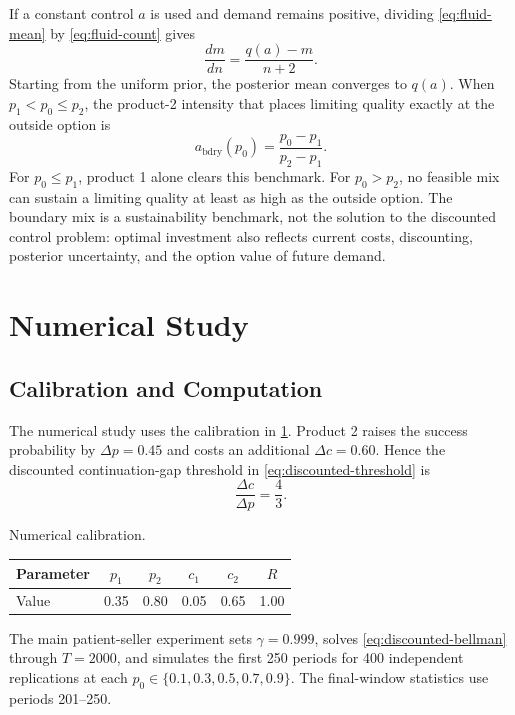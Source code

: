 \documentclass[opre]{informs3}
\begin{document}
If a constant control $a$ is used and demand remains positive, dividing
\cref{eq:fluid-mean} by \cref{eq:fluid-count} gives
\begin{equation}
    \frac{dm}{dn}=\frac{q(a)-m}{n+2}.
\end{equation}
Starting from the uniform prior, the posterior mean converges to $q(a)$. When
$p_1<p_0\leq p_2$, the product-2 intensity that places limiting quality exactly
at the outside option is
\begin{equation}
    a_{\mathrm{bdry}}(p_0)
    =
    \frac{p_0-p_1}{p_2-p_1}.
    \label{eq:boundary-mix}
\end{equation}
For $p_0\leq p_1$, product 1 alone clears this benchmark. For $p_0>p_2$, no
feasible mix can sustain a limiting quality at least as high as the outside
option. The boundary mix is a sustainability benchmark, not the solution to
the discounted control problem: optimal investment also reflects current
costs, discounting, posterior uncertainty, and the option value of future
demand.

\section{Numerical Study}

\subsection{Calibration and Computation}

The numerical study uses the calibration in \cref{tab:calibration}. Product 2
raises the success probability by $\Delta p=0.45$ and costs an additional
$\Delta c=0.60$. Hence the discounted continuation-gap threshold in
\cref{eq:discounted-threshold} is
\begin{equation}
    \frac{\Delta c}{\Delta p}=\frac{4}{3}.
\end{equation}

\begin{table}[H]
\TABLE
{Numerical calibration.\label{tab:calibration}}
{\begin{tabular}{lccccc}
\toprule
Parameter & $p_1$ & $p_2$ & $c_1$ & $c_2$ & $R$\\
\midrule
Value & 0.35 & 0.80 & 0.05 & 0.65 & 1.00\\
\bottomrule
\end{tabular}}
{}
\end{table}

The main patient-seller experiment sets $\gamma=0.999$, solves
\cref{eq:discounted-bellman} through $T=2000$, and simulates the first 250
periods for 400 independent replications at each
$p_0\in\{0.1,0.3,0.5,0.7,0.9\}$. The final-window statistics use periods
201--250.
\end{document}
